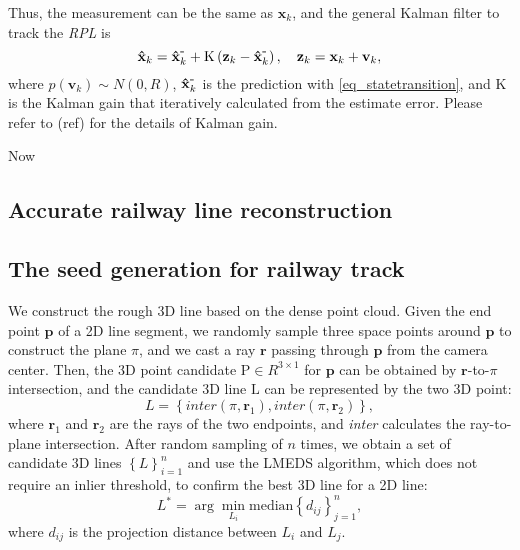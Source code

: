 Thus,
the measurement can be the same as $\mathbf x_k$,
and the general Kalman filter to track the \textit{RPL} is
\begin{equation}
    \mathbf {\hat x}_k =\mathbf {\hat x}_k^{\mbox -}+ \mathrm K\left(\mathbf z_k - \mathbf {\hat x}_k^{\mbox -}\right),\quad
    \mathbf z_k = \mathbf x_k+ \mathbf v_k,
\end{equation}
where $p \left(\mathbf v_k \right) \sim N(0, R)$,
$\mathbf {\hat x}_k^{\mbox -}$ is the prediction with \cref{eq_statetransition},
and $\mathrm K$ is the Kalman gain that iteratively calculated from the estimate error.
Please refer to (ref) for the details of Kalman gain. 

Now

\subsection{Accurate railway line reconstruction}
\label{sec_linereconstruction}

\subsection{The seed generation for railway track}
We construct the rough 3D line based on the dense point cloud.
Given the end point $\mathbf p$ of a 2D line segment,
we randomly sample three space points around $\mathbf p$ to construct the plane $\pi$,
and we cast a ray $\mathbf r$ passing through $\mathbf p$ from the camera center.
Then,
the 3D point candidate $\mathrm P \in R ^ {3\times1}$ for $\mathbf p$ can be obtained by $\mathbf r$-to-$\pi$ intersection,
and the candidate 3D line $\mathrm L$ can be represented by the two 3D point:
\begin{equation}
    L =\left\{\textit{inter} \left(\pi,\mathbf r_1\right),\textit{inter} \left(\pi,\mathbf r_2\right)  \right\},
\end{equation}
where $\mathbf r_1$ and $\mathbf r_2$ are the rays of the two endpoints,
and \textit{inter} calculates the ray-to-plane intersection.
After random sampling of $n$ times,
we obtain a set of candidate 3D lines $\left\{ L\right\}_{i=1}^n$ and use the LMEDS algorithm,
which does not require an inlier threshold, to confirm the best 3D line for a 2D line:
\begin{equation}
    L^* = \arg\min_{L_i} \text{median} \left\{ d_{ij}\right\}_{j=1}^n ,
\end{equation}
where $d_{ij}$ is the projection distance between $L_i$ and $L_j$.  

